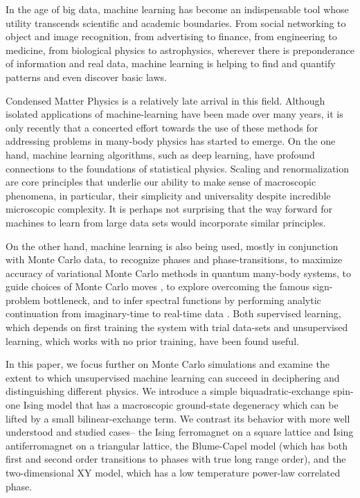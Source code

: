 \documentclass[pra,letterpaper,10pt,twocolumn]{revtex4}
\begin{document}
In the age of big data, machine learning has become an indispensable
tool whose utility transcends scientific and academic
boundaries\cite{Witten}. From social networking\cite{Nowell, Kyumin} to
object and image recognition\cite{Bishop, Rosten}, from advertising to
finance\cite{Pang}, from engineering to medicine\cite{King}, from
biological physics\cite{McKinney, Schafer} to
astrophysics\cite{VanderPlas}, wherever there is preponderance of
information and real data, machine learning is helping to find and
quantify patterns and even discover basic laws\cite{Crutchfield}.

Condensed Matter Physics is a relatively late arrival in this field.
Although isolated applications of machine-learning have been made over
many years, it is only recently that a concerted effort towards the use
of these methods for addressing problems in many-body physics has
started to emerge\cite{Carleo, Broecker, Torlai, Carrasquilla, Wang,
Schoenholz, Wei, Torlai2, Nieuwenburg, Khatami}. On the one hand, machine learning algorithms,
such as deep learning\cite{Hinton2, Krizhevsky}, have profound
connections to the foundations of statistical physics\cite{Engel,
Mehta}.  Scaling and renormalization\cite{Cardy} are core principles
that underlie our ability to make sense of macroscopic phenomena, in
particular, their simplicity and universality despite incredible
microscopic complexity. It is perhaps not surprising that the way
forward for machines to learn from large data sets would incorporate
similar principles.

On the other hand, machine learning is also being used, mostly in
conjunction with Monte Carlo\cite{Wolff, Robert, Katzgraber} data, to recognize
phases and phase-transitions\cite{Carrasquilla, Broecker, Wang, Nieuwenburg, Khatami, Wetzel}, to
maximize accuracy of variational Monte Carlo methods in quantum
many-body systems\cite{Carleo}, to guide choices of Monte Carlo 
moves \cite{Walter, Graham}, to
explore overcoming the famous sign-problem bottleneck\cite{Broecker}, and
to infer spectral functions by performing analytic continuation from
imaginary-time to real-time data \cite{Arsenault}. Both supervised
learning\cite{Carrasquilla, Liu_Junwei}, which depends on first training
the system with trial data-sets and unsupervised learning\cite{Wang},
which works with no prior training, have been found useful.

In this paper, we focus further on Monte Carlo simulations and examine
the extent to which unsupervised machine learning can succeed in
deciphering and distinguishing different physics. We introduce a simple
biquadratic-exchange spin-one Ising model that has a macroscopic
ground-state degeneracy which can be lifted by a small bilinear-exchange
term. We contrast its behavior with more well understood and studied
cases-- the Ising ferromagnet on a square lattice\cite{Binder_Ising} and Ising
antiferromagnet on a triangular lattice\cite{Wannier, Stephenson1,
Stephenson2}, the Blume-Capel
model\cite{Blume, Capel, BEG, Jain, Liu} (which has both first and
second order transitions to phases with true long range order), and the
two-dimensional XY model\cite{Barouch, Kosterlitz}, which has a low
temperature power-law correlated phase.
\end{document}
